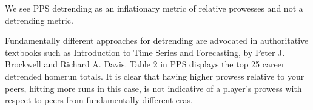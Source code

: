 \documentclass[11pt]{article}\usepackage[]{graphicx}\usepackage[]{color}
\begin{document}
We see PPS detrending as an inflationary metric of relative prowesses 
and not a detrending metric.  

Fundamentally different approaches for detrending are advocated in 
authoritative textbooks such as 
 Introduction to Time Series and Forecasting,
   by
 Peter J. Brockwell and Richard A. Davis.
Table 2 in PPS displays the top 25 career detrended homerun totals.  %
It is clear that having higher prowess relative to your peers, hitting more 
runs in this case, is not indicative of a player's prowess with respect to 
peers from fundamentally different eras.  




\end{document}
